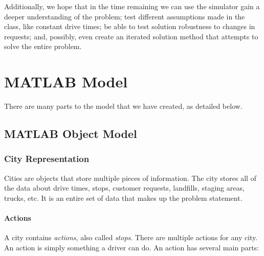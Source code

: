 \documentclass{article}
\begin{document}
Additionally, we hope that in the time remaining we can use the simulator gain a deeper understanding of the problem; test different assumptions made in the class, like constant drive times; be able to test solution robustness to changes in requests; and, possibly, even create an iterated solution method that attempts to solve the entire problem.

\section{MATLAB Model}

There are many parts to the model that we have created, as detailed below.

\subsection {MATLAB Object Model}


\subsubsection{City Representation}
Cities are objects that store multiple pieces of information. 
The city stores all of the data about drive times, stops, customer requests, landfills, staging areas, trucks, etc. 
It is an entire set of data that makes up the problem statement. 


\paragraph{Actions}
A city contains \emph{actions}, also called \emph{stops}.
There are multiple actions for any city.
An action is simply something a driver can do.
An action has several main parts:
\end{document}
